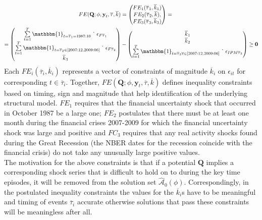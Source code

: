 \documentclass[a4paper,11pt,listof=nochaptergap,oneside,pointednumbers,bibtotoc,bigheadings,liststotoc]{scrbook}
\theoremstyle{mysatz}
\theoremstyle{mydefinition}
\theoremstyle{mytheorem}
\theoremstyle{mybemerkung}
\let\oldhat\hat
\newcommand{\vect}[1]{\boldsymbol{\mathbf{#1}}}
\newcommand{\hatt}[1]{\oldhat{\boldsymbol{\mathbf{#1}}}}
\begin{document}
\begin{equation} \label{eq:svar_ludvi12}
\begin{split}
	FE(\vect{Q}; \phi, \vect{y}_t, \overline{\tau}, \overline{k}) & = \begin{pmatrix}
	FE_1(\overline{\tau}_1, \overline{k}_1)\\
	 FE_2(\overline{\tau}_2, \overline{k}), \\
	 FE_3(\overline{\tau}_3, \overline{k}_3)
	\end{pmatrix} = \\
	= \begin{pmatrix}
	\sum\limits_{t=1}^T \mathbbm{1}_{t = \overline{\tau}_1= 1987:10} \dot \quad \epsilon_{F\overline{\tau}_1}  \\
	 \sum\limits_{t=1}^T \mathbbm{1}_{t = \overline{\tau}_2 \in [2007:12, 2009:06]} \dot \quad \epsilon_{F\overline{\tau}_2}  \\
	\overline{k}_3
	\end{pmatrix} & - 
	\begin{pmatrix}
	\overline{k}_1\\
	\overline{k}_2  \\
	\sum\limits_{t=1}^T \mathbbm{1}_{t = \overline{\tau}_3 \forall \in [2007:12, 2009:06]} \dot \quad \epsilon_{IPM\overline{\tau}_3} 
	\end{pmatrix} \geq \vect{0}
\end{split}								
\end{equation}
Each $FE_i(\overline{\tau}_i, \overline{k}_i)$ represents a vector of constraints of magnitude $\overline{k}_i$ on $\epsilon_{it}$ for corresponding $t \in \overline{\tau}_i$. Together, $FE(\vect{Q}; \phi, \vect{y}_t, \overline{\tau}, \overline{k})$ defines inequality constraints based on timing, sign and magnitude that help identification of the underlying structural model. $FE_1$ requires that the financial uncertainty shock that occurred in October 1987 be a large one; $FE_2$ postulates that there must be at least one month during the financial crises 2007-2009 for which the financial uncertainty shock was large and positive and $FC_3$ requires that any real activity shocks found during the Great Recession (the NBER dates for the recession coincide with the financial crisis) do not take any unusually large positive values.\\
The motivation for the above constraints is that if a potential $\vect{Q}$ implies a corresponding shock series that is difficult to hold on to during the key time episodes, it will be removed from the solution set $\hatt{\mathcal{A}}_0(\phi)$. Correspondingly, in the postulated inequality constraints the values for the $\overline{k}_i$s have to be meaningful and timing of events $\overline{\tau}_i$ accurate otherwise solutions that pass these constraints will be meaningless after all.
\end{document}
